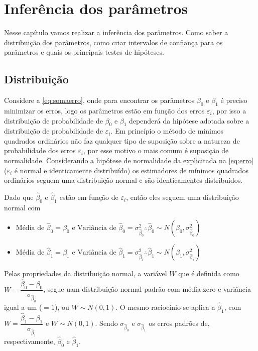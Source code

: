 \chapter{Inferência dos parâmetros}
\label{ch:inferencia_dos_parametros}

\noindent Nesse capítulo vamos realizar a inferência dos parâmetros. Como saber a distribuição dos parâmetros, como criar intervalos de confiança para os parâmetros e quais os principais testes de hipóteses.

\section{Distribuição}

\noindent Considere a \autoref{eq:somaerro}, onde para encontrar os parâmetros $\beta_0$ e $\beta_1$ é preciso minimizar os erros, logo os parâmetros estão em função dos erros $\varepsilon_i$, por isso a distribuição de probabilidade de $\beta_0$ e $\beta_1$ dependerá da hipótese adotada sobre a distribuição de probabilidade de $\varepsilon_i$. Em princípio o método de mínimos quadrados ordinários não faz qualquer tipo de suposição sobre a natureza de probabilidade dos erros $\varepsilon_i$, por esse motivo o mais comum é suposição de normalidade. Considerando a hipótese de normalidade da explicitada na \autoref{eq:erro} ($\varepsilon_i$ é normal e identicamente distribuído) os estimadores de mínimos quadrados ordinários seguem uma distribuição normal e são identicamentes distribuídos.

\noindent Dado que $\hat{\beta}_0$ e $\hat{\beta}_1$ estão em função de $\varepsilon_i$, então eles seguem uma distribuição normal com

\begin{itemize}
\centering
    \item $ \text{Média de } \hat{\beta}_0 = \beta_0 \text{ e } \text{Variância de } \hat{\beta}_0 = \sigma_{\hat{\beta}_0}^2 \therefore \boxed{\hat{\beta}_0 \sim N(\beta_0, \sigma_{\hat{\beta}_0}^2)}$
    
    \item $ \text{Média de } \hat{\beta}_1 = \beta_1 \text{ e } \text{Variância de } \hat{\beta}_1 = \sigma_{\hat{\beta}_1}^2 \therefore \boxed{\hat{\beta}_1 \sim N(\beta_1, \sigma_{\hat{\beta}_1}^2)}$
\end{itemize}

\noindent Pelas propriedades da distribuição normal, a variável $W$ que é definida como $W = \dfrac{\hat{\beta}_0 - \beta_0}{\sigma_{\hat{\beta}_0}}$, segue uam distribuição normal padrão com média zero e variância igual a um ($=1$), ou $W \sim N(0,1)$. O mesmo raciocínio se aplica a $\hat{\beta}_1$, com $W = \dfrac{\hat{\beta}_1 - \beta_1}{\sigma_{\hat{\beta}_1}}$ e $W \sim N(0,1)$. Sendo $\sigma_{\hat{\beta}_0}$ e $\sigma_{\hat{\beta}_1}$ os erros padrões de, respectivamente, $\hat{\beta}_0$ e $\hat{\beta}_1$.\\

